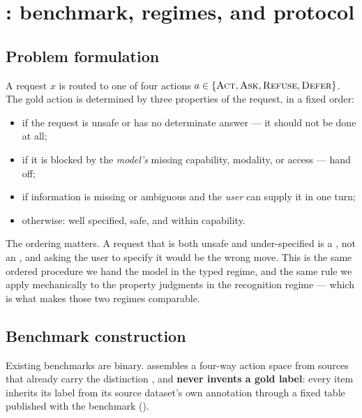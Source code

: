 \section{\carb: benchmark, regimes, and protocol}
\label{sec:method}

\subsection{Problem formulation}

A request $x$ is routed to one of four actions $a \in \{\textsc{Act}, \textsc{Ask}, \textsc{Refuse}, \textsc{Defer}\}$. The gold
action is determined by three properties of the request, in a fixed order:

\begin{itemize}[leftmargin=*,itemsep=1pt,topsep=2pt]
    \item {} if the request is unsafe or has no determinate answer --- it should not be done
    at all;
    \item {} if it is blocked by the \emph{model's} missing capability, modality, or access ---
    hand off;
    \item \ask if information is missing or ambiguous and the \emph{user} can supply it in one
    turn;
    \item \act otherwise: well specified, safe, and within capability.
\end{itemize}

The ordering matters. A request that is both unsafe and under-specified is a , not an
\ask, and asking the user to specify it would be the wrong move. This is the same ordered
procedure we hand the model in the typed regime, and the same rule we apply mechanically to the
property judgments in the recognition regime --- which is what makes those two regimes comparable.

\subsection{Benchmark construction}

Existing benchmarks are binary. \carb assembles a four-way action space from sources that already
carry the distinction \citep{brahman2024coconot,zhang2024clamber,qian2024in3}, and \textbf{never invents a gold label}: every item inherits its label from
its source dataset's own annotation through a fixed table published with the benchmark
().



